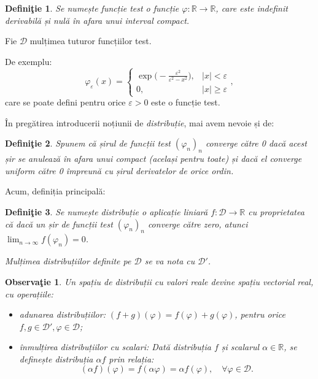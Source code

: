 \documentclass[12pt,a4paper]{article}
\newcommand\kal{\mathcal}
\newcommand\ds{\displaystyle}
\newcommand\RR{\mathbb{R}}
\theoremstyle{dotless}
\theoremstyle{dotlessdr}
\newtheorem{definition}{Defini\c{t}ie}
\newtheorem{remark}{Observa\c{t}ie}
\begin{document}
\begin{definition}\label{def:f-test}
  Se numește \emph{funcție test} o funcție $ \varphi : \RR \to \RR $, care este indefinit
  derivabilă și nulă în afara unui interval compact.
\end{definition}

Fie $ \kal{D} $ mulțimea tuturor funcțiilor test.

De exemplu:
\[
  \varphi_\varepsilon (x) =
  \begin{cases}
    \exp \Big( - \frac{\varepsilon^2}{\varepsilon^2 - x^2} \Big), & |x| < \varepsilon \\
    0, & |x| \geq \varepsilon
  \end{cases},
\]
care se poate defini pentru orice $ \varepsilon > 0 $ este o funcție test.

În pregătirea introducerii noțiunii de \emph{distribuție}, mai avem nevoie și de:
\begin{definition}\label{def:f-test-conv}
  Spunem că șirul de funcții test $ (\varphi_n)_n $ \emph{converge către 0} dacă acest
  șir se anulează în afara unui compact (același pentru toate) și dacă el converge
  uniform către 0 împreună cu șirul derivatelor de orice ordin.
\end{definition}

Acum, definiția principală:

\begin{definition}\label{def:distributie}
  Se numește \emph{distribuție} o aplicație liniară $ f : \kal{D} \to \RR $ cu proprietatea
  că dacă un șir de funcții test $ (\varphi_n)_n $ converge către zero, atunci
  $ \ds\lim_{n \to \infty} f(\varphi_n) = 0 $.

  Mulțimea distribuțiilor definite pe $ \kal{D} $ se va nota cu $ \kal{D}' $.
\end{definition}

\begin{remark}\label{rk:distr-sp-vec}
  Un spațiu de distribuții cu valori reale devine spațiu vectorial real, cu operațiile:
  \begin{itemize}
  \item \emph{adunarea distribuțiilor}: $ (f + g)(\varphi) = f(\varphi) + g(\varphi) $,
    pentru orice $ f, g \in \kal{D}', \varphi \in \kal{D} $;
  \item \emph{înmulțirea distribuțiilor cu scalari}: Dată distribuția $ f $ și scalarul
    $ \alpha \in \RR $, se definește distribuția $ \alpha f $ prin relația:
    \[
      (\alpha f)(\varphi) = f(\alpha \varphi) = \alpha f(\varphi), %
      \quad \forall \varphi \in \kal{D}.
    \]
  \end{itemize}
\end{remark}
\end{document}
